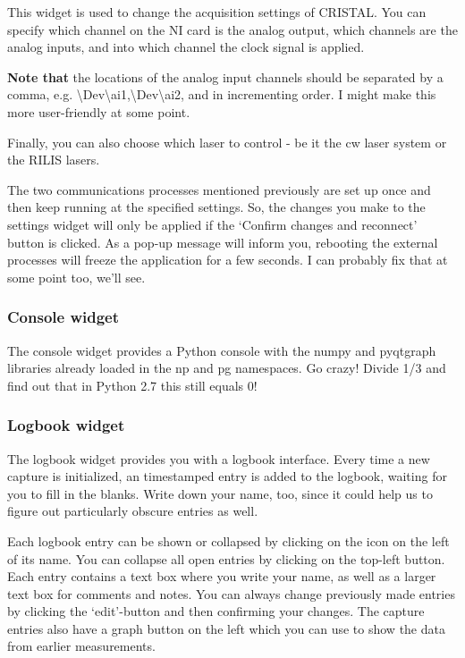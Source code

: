\documentclass[10pt,a4paper]{article}
\begin{document}
This widget is used to change the acquisition settings of CRISTAL. You can specify which channel on the NI card is the analog output, which channels are the analog inputs, and into which channel the clock signal is applied. 

\textbf{Note that} the locations of the analog input channels should be separated by a comma, e.g. \textbackslash Dev\textbackslash ai1,\textbackslash Dev\textbackslash ai2, and in incrementing order. I might make this more user-friendly at some point.

Finally, you can also choose which laser to control - be it the cw laser system or the RILIS lasers. 

The two communications processes mentioned previously are set up once and then keep running at the specified settings. So, the changes you make to the settings widget will only be applied if the `Confirm changes and reconnect' button is clicked. As a pop-up message will inform you, rebooting the external processes will freeze the application for a few seconds. I can probably fix that at some point too, we'll see.

\subsubsection{Console widget}

The console widget provides a Python console with the numpy and pyqtgraph libraries already loaded in the np and pg namespaces. Go crazy! Divide 1/3 and find out that in Python 2.7 this still equals 0!

\subsubsection{Logbook widget}

The logbook widget provides you with a logbook interface. Every time a new capture is initialized, an timestamped entry is added to the logbook, waiting for you to fill in the blanks. Write down your name, too, since it could help us to figure out particularly obscure entries as well.

Each logbook entry can be shown or collapsed by clicking on the icon on the left of its name. You can collapse all open entries by clicking on the top-left button. Each entry contains a text box where you write your name, as well as a larger text box for comments and notes. You can always change previously made entries by clicking the `edit'-button and then confirming your changes. The capture entries also have a graph button on the left which you can use to show the data from earlier measurements.\\
\end{document}
